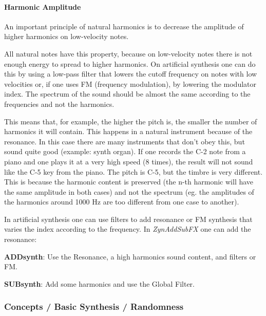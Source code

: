 \paragraph{Harmonic Amplitude}
\label{paragraph:concepts_basics_harmonic_amplitude}

   An important principle of natural harmonics is to decrease the amplitude
   of higher harmonics on low-velocity notes.

   All natural notes have this property, because on low-velocity notes there
   is not enough energy to spread to higher harmonics. On artificial
   synthesis one can do this by using a low-pass filter that lowers the
   cutoff frequency on notes with low velocities or, if one uses FM
   (frequency modulation), by lowering the modulator index. 
   The spectrum of the sound should be almost the same according to
   the frequencies and not the harmonics.

   This means that, for example, the higher the pitch is, the smaller the
   number of harmonics it will contain. This happens in a natural instrument
   because of the resonance. 
   In this case there are many instruments that don't obey this, but sound
   quite good (example: synth organ). 
   If one records the C-2 note from a piano and one plays it at a very high
   speed (8 times), the result will not sound like the C-5 key from the
   piano. The pitch is C-5, but the timbre is very different. This is because
   the harmonic content is preserved (the n-th harmonic will have the
   same amplitude in both cases) and not the spectrum (eg. the
   amplitudes of the harmonics around 1000 Hz are too different from
   one case to another). 

   In artificial synthesis one can use filters to add resonance or FM
   synthesis that varies the index according to the frequency.  In
   \textsl{ZynAddSubFX} one can add the resonance:

   \begin{enumber}
      \item \textbf{ADDsynth}:
      Use the Resonance, a high harmonics sound content, and filters or FM.
      \item \textbf{SUBsynth}:
      Add some harmonics and use the Global Filter.
   \end{enumber}

\subsubsection{Concepts / Basic Synthesis / Randomness}
\label{subsubsec:concepts_basics_randomness}

